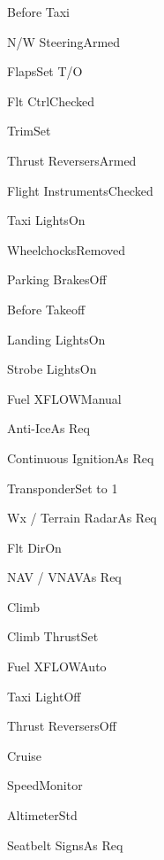 \documentclass[sim-use, halfpage]{checklist}
\begin{document}
\begin{checklist}{Before Taxi}
    \item{N/W Steering}{Armed}
    \item{Flaps}{Set T/O}
    \item{Flt Ctrl}{Checked}
    \item{Trim}{Set}
    \item{Thrust Reversers}{Armed}
    \item{Flight Instruments}{Checked}
    \item{Taxi Lights}{On}
    \item{Wheelchocks}{Removed}
    \item{Parking Brakes}{Off}
\end{checklist}

\begin{checklist}{Before Takeoff}
    \item{Landing Lights}{On}
    \item{Strobe Lights}{On}
    \item{Fuel XFLOW}{Manual}
    \item{Anti-Ice}{As Req}
    \item{Continuous Ignition}{As Req}
    \item{Transponder}{Set to 1}
    \item{Wx / Terrain Radar}{As Req}
    \item{Flt Dir}{On}
    \item{NAV / VNAV}{As Req}
\end{checklist}

\begin{checklist}{Climb}
    \item{Climb Thrust}{Set}
    \item{Fuel XFLOW}{Auto}
    \item{Taxi Light}{Off}
    \item{Thrust Reversers}{Off}
\end{checklist}

\begin{checklist}{Cruise}
    \item{Speed}{Monitor}
    \item{Altimeter}{Std}
    \item{Seatbelt Signs}{As Req}
\end{checklist}  
\end{document}
